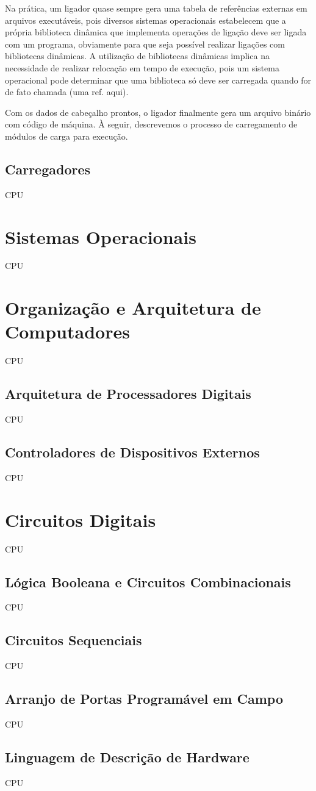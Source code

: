 Na prática, um ligador quase sempre gera uma tabela de referências externas em arquivos executáveis, pois diversos sistemas operacionais estabelecem que a própria biblioteca dinâmica que implementa operações de ligação deve ser ligada com um programa, obviamente para que seja possível realizar ligações com bibliotecas dinâmicas. A utilização de bibliotecas dinâmicas implica na necessidade de realizar relocação em tempo de execução, pois um sistema operacional pode determinar que uma biblioteca só deve ser carregada quando for de fato chamada (uma ref. aqui).

Com os dados de cabeçalho prontos, o ligador finalmente gera um arquivo binário com código de máquina. À seguir, descrevemos o processo de carregamento de módulos de carga para execução.

\subsection{Carregadores}

CPU

\section{Sistemas Operacionais}

CPU

\section{Organização e Arquitetura de Computadores}

CPU

\subsection{Arquitetura de Processadores Digitais}

CPU

\subsection{Controladores de Dispositivos Externos}

CPU

\section{Circuitos Digitais}

CPU

\subsection{Lógica Booleana e Circuitos Combinacionais}

CPU

\subsection{Circuitos Sequenciais}

CPU

\subsection{Arranjo de Portas Programável em Campo}

CPU

\subsection{Linguagem de Descrição de Hardware}

CPU
